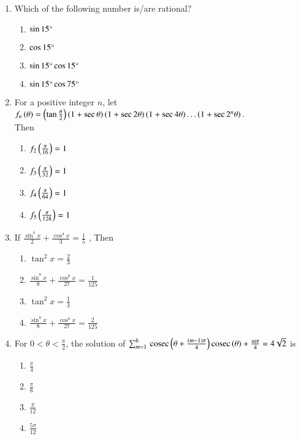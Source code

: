 \documentclass[journal,12pt,onecolumn]{IEEEtran}
\theoremstyle{remark}
\begin{document}
\begin{enumerate}
\item Which of the following number is/are rational? \hfill{} 
\begin{enumerate}
    \item $\sin{15}\degree$
    \item $\cos{15}\degree$
    \item $\sin{15}\degree \cos{15}\degree$
    \item $\sin{15}\degree \cos{75}\degree$
\end{enumerate}
\item For a positive integer $n$, let \ 
$f_n\left(\theta\right) = \left(\tan\frac{\theta}{2}\right)\left(1+\sec{\theta}\right)\left(1+\sec{2\theta}\right)\left(1+\sec4\theta\right)\dots\left(1+\sec2^n{\theta}\right).$ \\Then  \hfill{}
\begin{enumerate}
    \item $f_2\left(\frac{\pi}{16}\right) = 1$
    \item $f_3\left(\frac{\pi}{32}\right) = 1$
    \item $f_4\left(\frac{\pi}{64}\right) = 1$
    \item $f_5\left(\frac{\pi}{128}\right) = 1$
\end{enumerate}
\item If $\frac{\sin^4{x}}{2}+\frac{\cos^4{x}}{3}=\frac{1}{5}$ , Then \hfill{} 
\begin{enumerate}
    \item $\tan^2{x}=\frac{2}{3}$
    \item $\frac{\sin^8{x}}{8}+\frac{\cos^8{x}}{27}=\frac{1}{125}$
    \item $\tan^2{x}=\frac{1}{3}$
    \item $\frac{\sin^8{x}}{8}+\frac{\cos^8{x}}{27}=\frac{2}{125}$
\end{enumerate}
\item For $ 0<\theta <\frac{\pi}{2}$, the solution of $\sum_{m=1}^{6}\,\text{cosec}\,{\left(\theta+\frac{\left(m-1\right)\pi}{4}\right)}\,\text{cosec}\,{{\left(\theta\right)+\frac{m\pi}{4}} }= 4\sqrt{2}$ is \hfill{}
\begin{enumerate}
    \item $\frac{\pi}{4}$
    \item $\frac{\pi}{6}$
    \item $\frac{\pi}{12}$
    \item $\frac{5\pi}{12}$
\end{enumerate}


\end{enumerate}
\end{document}
